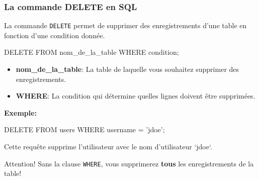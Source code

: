 \begin{frame}[fragile]
  \frametitle{La commande DELETE en SQL}

  La commande \texttt{DELETE} permet de supprimer des enregistrements d'une table en fonction d'une condition donnée.

  \begin{semiverbatim}
DELETE FROM nom\_de\_la\_table
WHERE condition;
  \end{semiverbatim}

  \begin{itemize}
    \item \textbf{nom\_de\_la\_table}: La table de laquelle vous souhaitez supprimer des enregistrements.
    \item \textbf{WHERE}: La condition qui détermine quelles lignes doivent être supprimées.
  \end{itemize}

  \textbf{Exemple:}
  \begin{semiverbatim}
DELETE FROM users
WHERE username = 'jdoe';
  \end{semiverbatim}

  Cette requête supprime l'utilisateur avec le nom d'utilisateur `jdoe`.

  \alert{Attention!} Sans la clause \texttt{WHERE}, vous supprimerez \textbf{tous} les enregistrements de la table!

\end{frame}

